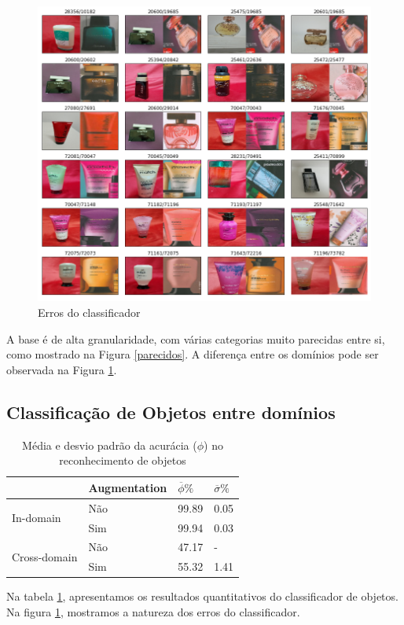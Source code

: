 \documentclass[conference]{IEEEtran}
\begin{document}
\begin{figure}[ht!]
\begin{center}
\includegraphics[width=\columnwidth]{erros.png}
\caption{Erros do classificador}\label{erros}
\end{center}
\end{figure}
A base é de alta granularidade, com várias categorias muito parecidas entre si, como mostrado na Figura \ref{parecidos}. A diferença entre os domínios pode ser observada na Figura \ref{erros}.

\subsection{Classificação de Objetos entre domínios}

\begin{table}[]
\centering
\caption{Média e desvio padrão da acurácia ($\phi$) no reconhecimento de objetos}
\label{tabela}
\begin{tabular}{@{}llll@{}}
\toprule
 & Augmentation & $\overline{\phi}\%$ & $\overline{\sigma}\%$ \\ \midrule
\multicolumn{1}{l}{\multirow{2}{*}{In-domain}} & \multicolumn{1}{l}{Não} & \multicolumn{1}{l}{99.89} & \multicolumn{1}{l}{0.05} \\ \cmidrule(l){2-4} 
\multicolumn{1}{l}{} & \multicolumn{1}{l}{Sim} & \multicolumn{1}{l}{99.94} & \multicolumn{1}{l}{0.03} \\ \midrule
\multicolumn{1}{l}{\multirow{2}{*}{Cross-domain}} & \multicolumn{1}{l}{Não} & \multicolumn{1}{l}{47.17} & \multicolumn{1.53}{l}{-} \\ \cmidrule(l){2-4} 
\multicolumn{1}{l}{} & \multicolumn{1}{l}{Sim} & \multicolumn{1}{l}{55.32} & \multicolumn{1}{l}{1.41} \\ \bottomrule
\end{tabular}
\end{table}
Na tabela \ref{tabela}, apresentamos os resultados quantitativos do classificador de objetos. Na figura \ref{erros}, mostramos a natureza dos erros do classificador.
\end{document}
